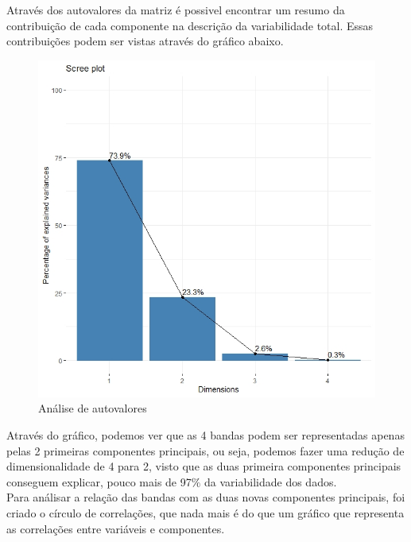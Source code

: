 \documentclass[a4paper,12pt]{article}
\begin{document}
Através dos autovalores da matriz é possivel encontrar um resumo da contribuição de cada componente na descrição da variabilidade total. Essas contribuições podem ser vistas através do gráfico abaixo.\\

\begin{center}
\begin{figure}[H]
    \centering
    \includegraphics[width = 0.9 \textwidth]{boxplot.jpeg}
    \caption{Análise de autovalores}
\end{figure}    
\end{center}

Através do gráfico, podemos ver que as 4 bandas podem ser representadas apenas pelas 2 primeiras componentes principais, ou seja, podemos fazer uma redução de dimensionalidade de 4 para 2, visto que as duas primeira componentes principais conseguem explicar, pouco mais de 97$\%$ da variabilidade dos dados.\\

Para análisar a relação das bandas com as duas novas componentes principais, foi criado o círculo de correlações, que nada mais é do que um gráfico que representa as correlações entre variáveis e componentes.
\end{document}
